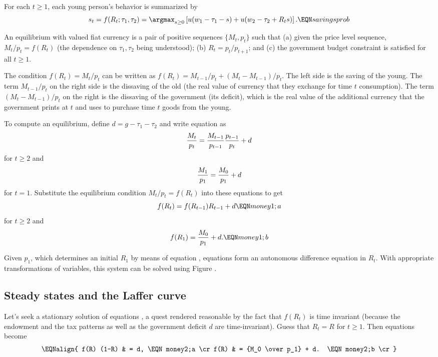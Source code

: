    For each $t \geq 1$, each young person's behavior
is summarized by
$$  s_t = f(R_t;\tau_1, \tau_2) = \argmax_{s\geq 0} \left[ u(w_1 - \tau_1
     -s)+u(w_2-\tau_2 + R_t s)\right] .\EQN savingsprob $$


\medskip
{} An equilibrium with valued fiat currency is a pair  of
positive sequences $\{M_t, p_t\}$  such that (a) given the price level
sequence, $M_t/p_t =  f(R_t)$ (the dependence on $\tau_1,\tau_2$ being
understood); (b) $R_t = p_t / p_{t+1}$; and (c) the government budget
constraint  is satisfied for all $t\geq 1$.
\medskip

The condition $f(R_t) = M_t/p_t$  can be written
as $f(R_t) = M_{t-1} /p_t + (M_t - M_{t-1})/p_t$.  The left side
is the saving of the young.  The  term $M_{t-1} /p_t$ on  the right side is the
dissaving of the old (the real value of currency  that they
exchange for time $t$ consumption). The  term $(M_t - M_{t-1})/p_t$  on the right
is the dissaving of the government (its deficit), which is
the real value of the additional currency that the government
prints at $t$ and uses to purchase time $t$ goods from the young.

   To compute an equilibrium, define $d = g- \tau_1 - \tau_2$ and
write equation  as
$$ {M_t \over  p_t} = {M_{t-1} \over p_{t-1} }  {p_{t-1} \over p_t}
     + d  $$
for $t \geq 2$
and $$ {M_1 \over p_1} = {M_0 \over p_1} + d $$
for $t=1$.
Substitute the equilibrium condition $M_t / p_t = f(R_t)$ into these equations to
get
$$ f(R_t) = f(R_{t-1})R_{t-1} + d  \EQN money1;a $$
for $t\geq 2$ and
$$ f(R_1) =  {M_0 \over p_1} + d. \EQN money1;b $$


 Given $p_1$, which determines an initial
$R_1$ by means of equation
, equations  form an autonomous
difference equation in $R_t$.    With appropriate transformations of variables, this system can be
solved using Figure . %


\subsection{Steady states and the Laffer curve}

Let's seek a stationary solution of equations  , a quest
 rendered reasonable by the fact that $f(R_t)$ is time
invariant (because the endowment and the
tax patterns as well as the government deficit
$d$  are time-invariant).     Guess that $R_t = R$ for
$t \geq 1$.  Then equations  become
$$\EQNalign{ f(R) (1-R) & = d, \EQN money2;a \cr
             f(R) &  = {M_0   \over p_1}  + d. \EQN money2;b \cr} $$


